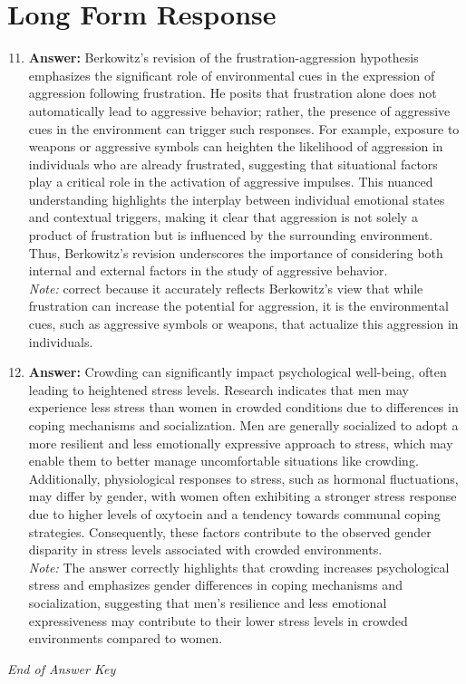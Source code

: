 \documentclass[12pt]{article}
\begin{document}
\section*{Long Form Response}
\begin{enumerate}[label=\arabic*.]
\setcounter{enumi}{10}
\item \textbf{Answer:} Berkowitz's revision of the frustration-aggression hypothesis emphasizes the significant role of environmental cues in the expression of aggression following frustration. He posits that frustration alone does not automatically lead to aggressive behavior; rather, the presence of aggressive cues in the environment can trigger such responses. For example, exposure to weapons or aggressive symbols can heighten the likelihood of aggression in individuals who are already frustrated, suggesting that situational factors play a critical role in the activation of aggressive impulses. This nuanced understanding highlights the interplay between individual emotional states and contextual triggers, making it clear that aggression is not solely a product of frustration but is influenced by the surrounding environment. Thus, Berkowitz's revision underscores the importance of considering both internal and external factors in the study of aggressive behavior.
\\ \textit{Note:} correct because it accurately reflects Berkowitz's view that while frustration can increase the potential for aggression, it is the environmental cues, such as aggressive symbols or weapons, that actualize this aggression in individuals.
\item \textbf{Answer:} Crowding can significantly impact psychological well-being, often leading to heightened stress levels. Research indicates that men may experience less stress than women in crowded conditions due to differences in coping mechanisms and socialization. Men are generally socialized to adopt a more resilient and less emotionally expressive approach to stress, which may enable them to better manage uncomfortable situations like crowding. Additionally, physiological responses to stress, such as hormonal fluctuations, may differ by gender, with women often exhibiting a stronger stress response due to higher levels of oxytocin and a tendency towards communal coping strategies. Consequently, these factors contribute to the observed gender disparity in stress levels associated with crowded environments.
\\ \textit{Note:} The answer correctly highlights that crowding increases psychological stress and emphasizes gender differences in coping mechanisms and socialization, suggesting that men's resilience and less emotional expressiveness may contribute to their lower stress levels in crowded environments compared to women.
\end{enumerate}

\vfill
\noindent\textit{End of Answer Key}
\end{document}
